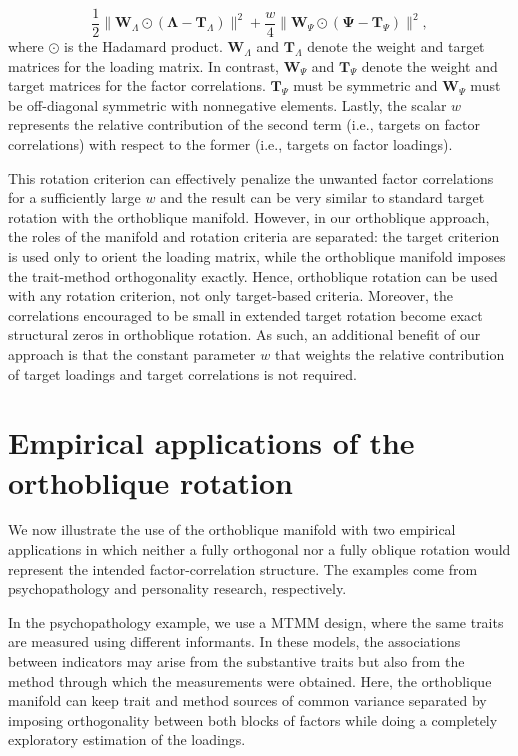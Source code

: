 \documentclass[
  12pt,
  letterpaper,
  article]{scrartcl}
\begin{document}
\[
\frac{1}{2}\| \mathbf{W}_{\Lambda} \odot (\boldsymbol{\Lambda} - \mathbf{T}_{\Lambda})\|^2 + \frac{w}{4}\|\mathbf{W}_{\Psi} \odot (\boldsymbol{\Psi} - \mathbf{T}_{\Psi})\|^2,
\] where \(\odot\) is the Hadamard product. \(\mathbf{W}_{\Lambda}\) and
\(\mathbf{T}_{\Lambda}\) denote the weight and target matrices for the
loading matrix. In contrast, \(\mathbf{W}_{\Psi}\) and
\(\mathbf{T}_{\Psi}\) denote the weight and target matrices for the
factor correlations. \(\mathbf{T}_{\Psi}\) must be symmetric and
\(\mathbf{W}_{\Psi}\) must be off-diagonal symmetric with nonnegative
elements. Lastly, the scalar \(w\) represents the relative contribution
of the second term (i.e., targets on factor correlations) with respect
to the former (i.e., targets on factor loadings).

This rotation criterion can effectively penalize the unwanted factor
correlations for a sufficiently large \(w\) and the result can be very
similar to standard target rotation with the orthoblique manifold.
However, in our orthoblique approach, the roles of the manifold and
rotation criteria are separated: the target criterion is used only to
orient the loading matrix, while the orthoblique manifold imposes the
trait-method orthogonality exactly. Hence, orthoblique rotation can be
used with any rotation criterion, not only target-based criteria.
Moreover, the correlations encouraged to be small in extended target
rotation become exact structural zeros in orthoblique rotation. As such,
an additional benefit of our approach is that the constant parameter
\(w\) that weights the relative contribution of target loadings and
target correlations is not required.

\section{Empirical applications of the orthoblique
rotation}\label{empirical-applications-of-the-orthoblique-rotation}

We now illustrate the use of the orthoblique manifold with two empirical
applications in which neither a fully orthogonal nor a fully oblique
rotation would represent the intended factor-correlation structure. The
examples come from psychopathology and personality research,
respectively.

In the psychopathology example, we use a MTMM design, where the same
traits are measured using different informants. In these models, the
associations between indicators may arise from the substantive traits
but also from the method through which the measurements were obtained.
Here, the orthoblique manifold can keep trait and method sources of
common variance separated by imposing orthogonality between both blocks
of factors while doing a completely exploratory estimation of the
loadings.
\end{document}
